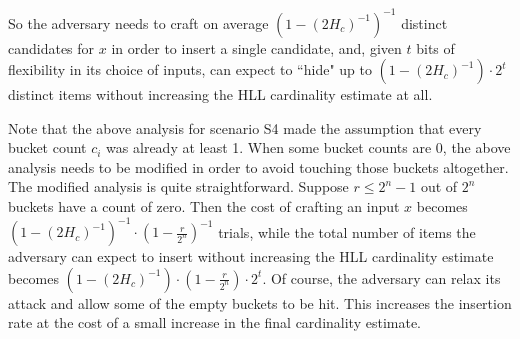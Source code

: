 \documentclass[11pt]{article}
\begin{document}
So the adversary needs to craft on average $(1-(2H_c)^{-1})^{-1}$ distinct candidates for $x$ in order to insert a single candidate, and, given $t$ bits of flexibility in its choice of inputs, can expect to ``hide" up to $(1-(2H_c)^{-1}) \cdot 2^t$ distinct items without increasing the HLL cardinality estimate at all.


Note that the above analysis for scenario S4 made the assumption that every bucket count $c_i$ was already at least 1. When some bucket counts are 0, the above analysis needs to be modified in order to avoid touching those buckets altogether. The modified analysis is quite straightforward. Suppose $r \le 2^n-1$ out of $2^n$ buckets have a count of zero. Then the cost of crafting an input $x$ becomes $(1-(2H_c)^{-1})^{-1} \cdot (1- \frac{r}{2^n})^{-1}$ trials, while the total number of items the adversary can expect to insert without increasing the HLL cardinality estimate becomes $(1-(2H_c)^{-1}) \cdot (1- \frac{r}{2^n})\cdot 2^t$. Of course, the adversary can relax its attack and allow some of the empty buckets to be hit. This increases the insertion rate at the cost of a small increase in the final cardinality estimate.
\end{document}

